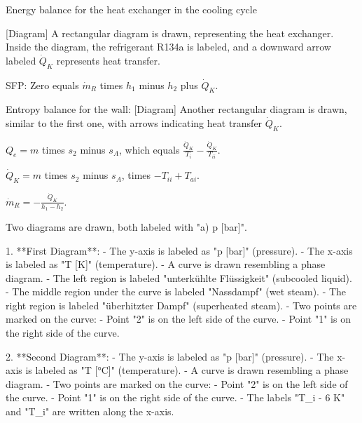 Energy balance for the heat exchanger in the cooling cycle  

[Diagram]  
A rectangular diagram is drawn, representing the heat exchanger. Inside the diagram, the refrigerant R134a is labeled, and a downward arrow labeled \( \dot{Q}_K \) represents heat transfer.  

SFP:  
Zero equals \( \dot{m}_R \) times \( h_1 \) minus \( h_2 \) plus \( \dot{Q}_K \).  

Entropy balance for the wall:  
[Diagram]  
Another rectangular diagram is drawn, similar to the first one, with arrows indicating heat transfer \( \dot{Q}_K \).  

\( Q_e = m \) times \( s_2 \) minus \( s_A \), which equals \( \frac{\dot{Q}_K}{T_i} - \frac{\dot{Q}_K}{T_{ii}} \).  

\( \dot{Q}_K = m \) times \( s_2 \) minus \( s_A \), times \( -T_{ii} + T_{ai} \).  

\( \dot{m}_R = -\frac{\dot{Q}_K}{h_1 - h_2} \).

Two diagrams are drawn, both labeled with "a) p [bar]".  

1. **First Diagram**:  
   - The y-axis is labeled as "p [bar]" (pressure).  
   - The x-axis is labeled as "T [K]" (temperature).  
   - A curve is drawn resembling a phase diagram.  
   - The left region is labeled "unterkühlte Flüssigkeit" (subcooled liquid).  
   - The middle region under the curve is labeled "Nassdampf" (wet steam).  
   - The right region is labeled "überhitzter Dampf" (superheated steam).  
   - Two points are marked on the curve:  
     - Point "2" is on the left side of the curve.  
     - Point "1" is on the right side of the curve.  

2. **Second Diagram**:  
   - The y-axis is labeled as "p [bar]" (pressure).  
   - The x-axis is labeled as "T [°C]" (temperature).  
   - A curve is drawn resembling a phase diagram.  
   - Two points are marked on the curve:  
     - Point "2" is on the left side of the curve.  
     - Point "1" is on the right side of the curve.  
   - The labels "T_i - 6 K" and "T_i" are written along the x-axis.
